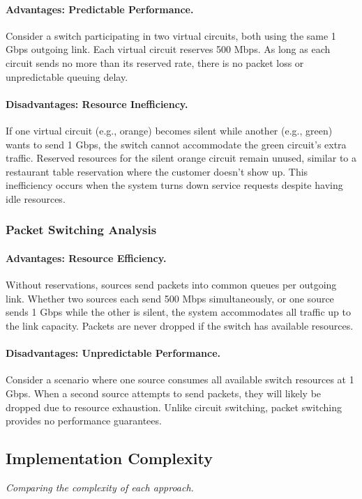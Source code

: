 \documentclass[../../compsys.tex]{subfiles}
\begin{document}
\paragraph{Advantages: Predictable Performance.} Consider a switch participating in two virtual circuits, both using the same 1 Gbps outgoing link. Each virtual circuit reserves 500 Mbps. As long as each circuit sends no more than its reserved rate, there is no packet loss or unpredictable queuing delay.

\paragraph{Disadvantages: Resource Inefficiency.} If one virtual circuit (e.g., orange) becomes silent while another (e.g., green) wants to send 1 Gbps, the switch cannot accommodate the green circuit's extra traffic. Reserved resources for the silent orange circuit remain unused, similar to a restaurant table reservation where the customer doesn't show up. This inefficiency occurs when the system turns down service requests despite having idle resources.

\subsubsection{Packet Switching Analysis}

\paragraph{Advantages: Resource Efficiency.} Without reservations, sources send packets into common queues per outgoing link. Whether two sources each send 500 Mbps simultaneously, or one source sends 1 Gbps while the other is silent, the system accommodates all traffic up to the link capacity. Packets are never dropped if the switch has available resources.

\paragraph{Disadvantages: Unpredictable Performance.} Consider a scenario where one source consumes all available switch resources at 1 Gbps. When a second source attempts to send packets, they will likely be dropped due to resource exhaustion. Unlike circuit switching, packet switching provides no performance guarantees.

\subsection{Implementation Complexity}
\textit{Comparing the complexity of each approach.}
\end{document}
